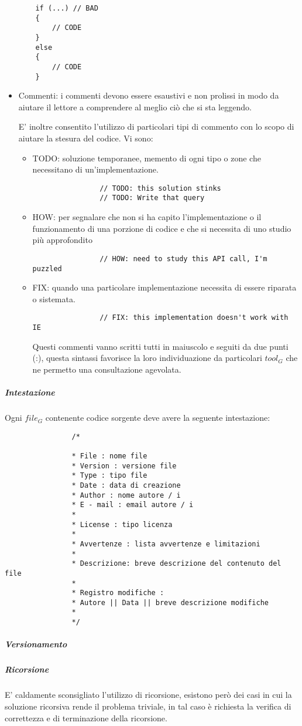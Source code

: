 \begin{itemize}
\begin{lstlisting}
	if (...) // BAD
	{
	 	// CODE
	}
	else 
	{
		// CODE
	}
\end{lstlisting}

			\item Commenti: i commenti devono essere esaustivi e non prolissi in modo da aiutare il lettore a comprendere al meglio ciò che si sta leggendo.
			
			
			E' inoltre consentito l'utilizzo di particolari tipi di commento con lo scopo di aiutare la stesura del codice. Vi sono:
			\begin{itemize}
				\item TODO: soluzione temporanee, memento di ogni tipo o zone che necessitano di un'implementazione.
				\begin{lstlisting}
				// TODO: this solution stinks
				// TODO: Write that query
				\end{lstlisting}
				
				\item HOW: per segnalare che non si ha capito l'implementazione o il funzionamento di una porzione di codice e che si necessita di uno studio più approfondito
				\begin{lstlisting}
				// HOW: need to study this API call, I'm puzzled
				\end{lstlisting}
				
				\item FIX: quando una particolare implementazione necessita di essere riparata o sistemata.
				\begin{lstlisting}
				// FIX: this implementation doesn't work with IE
				\end{lstlisting}
				Questi commenti vanno scritti tutti in maiuscolo e seguiti da due punti (:), questa sintassi favorisce la loro individuazione da particolari $tool_G$ che ne permetto una consultazione agevolata.
			\end{itemize}

			\end{itemize}
			\subparagraph{Intestazione}
			Ogni $file_G$ contenente codice sorgente deve avere la seguente intestazione:
			\begin{lstlisting}
				/*
				
				* File : nome file
				* Version : versione file
				* Type : tipo file
				* Date : data di creazione
				* Author : nome autore / i
				* E - mail : email autore / i
				*
				* License : tipo licenza				
				*				
				* Avvertenze : lista avvertenze e limitazioni
				*
				* Descrizione: breve descrizione del contenuto del file
				*
				* Registro modifiche :
				* Autore || Data || breve descrizione modifiche
				*
				*/
			\end{lstlisting}
			\subparagraph{Versionamento}
			\subparagraph{Ricorsione}
			E' caldamente sconsigliato l'utilizzo di ricorsione, esistono però dei casi in cui la soluzione ricorsiva rende il problema triviale, in tal caso è richiesta la verifica di correttezza e di terminazione della ricorsione.
